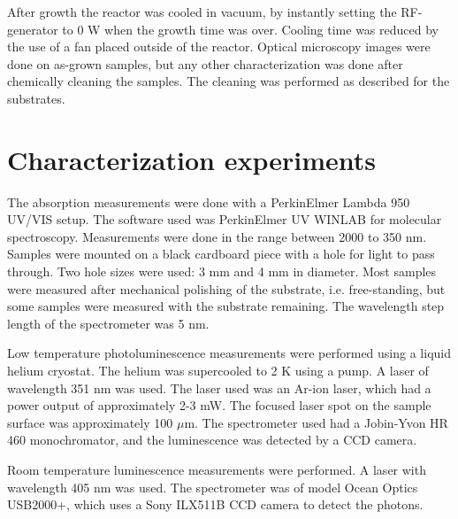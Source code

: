 After growth the reactor was cooled in vacuum, by instantly setting the RF-generator to 0 W when the growth time was over. Cooling time was reduced by the use of a fan placed outside of the reactor. Optical microscopy images were done on as-grown samples, but any other characterization was done after chemically cleaning the samples. The cleaning was performed as described for the substrates. 

\section{Characterization experiments}
\label{sec:experimental:characterization}
The absorption measurements were done with a PerkinElmer Lambda 950 UV/VIS setup. The software used was PerkinElmer UV WINLAB for molecular spectroscopy. Measurements were done in the range between 2000 to 350 nm. Samples were mounted on a black cardboard piece with a hole for light to pass through. Two hole sizes were used: 3 mm and 4 mm in diameter. Most samples were measured after mechanical polishing of the substrate, i.e. free-standing, but some samples were measured with the substrate remaining. The wavelength step length of the spectrometer was 5 nm. 

Low temperature photoluminescence measurements were performed using a liquid helium cryostat. The helium was supercooled to 2 K using a pump. A laser of wavelength 351 nm was used. The laser used was an Ar-ion laser, which had a power output of approximately 2-3 mW. The focused laser spot on the sample surface was approximately 100 $\mu$m. The spectrometer used had a Jobin-Yvon HR 460 monochromator, and the luminescence was detected by a CCD camera. 

Room temperature luminescence measurements were performed. A laser with wavelength 405 nm was used. The spectrometer was of model Ocean Optics USB2000+, which uses a Sony ILX511B CCD camera to detect the photons. 









































